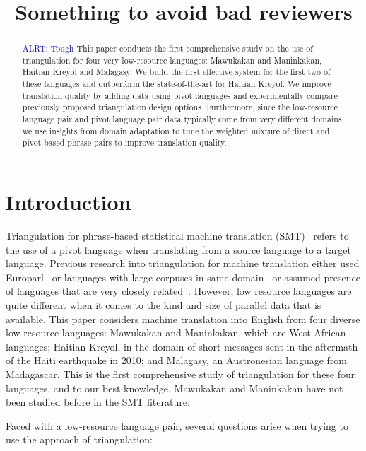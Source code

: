 \documentclass[11pt]{article}
\title{Something to avoid bad reviewers}
\author{}
\date{}
\newcommand{\alert}[1]{{\textcolor{blue}{ALRT: #1}}}
\begin{document}
\maketitle

\begin{abstract}
\alert{Tough}
This paper conducts the first comprehensive study on the use of triangulation for four very low-resource languages: Mawukakan and Maninkakan, Haitian Kreyol and Malagasy. We build the first effective system for the first two of these languages and outperform the state-of-the-art for Haitian Kreyol. We improve translation quality by adding data using pivot languages and experimentally compare previously proposed triangulation design options. Furthermore, since the low-resource language pair and pivot language pair data typically come from very different domains, we use insights from domain adaptation to tune the weighted mixture of direct and pivot based phrase pairs to improve translation quality.
\end{abstract}

\section{Introduction}

Triangulation for phrase-based statistical machine translation (SMT)~\cite{Utiyama:07,Cohn:07,Wuwang:07} refers to the use of a pivot language when translating from a source language to a target language. Previous research into triangulation for machine translation either used Europarl~\cite{Cohn:07,Utiyama:07,Huck:12} or languages with large corpuses in same domain~\cite{Gispert:06} or assumed presence of languages that are very closely related~\cite{Nakov:12,Nakovemnlp:12}. However, low resource languages are quite different when it comes to the kind and size of parallel data that is available. This paper considers machine translation into English from four diverse low-resource languages: Mawukakan and Maninkakan, which are West African languages;  Haitian Kreyol, in the domain of short messages sent in the aftermath of the Haiti earthquake in 2010; and Malagasy, an Austronesian language from Madagascar. This is the first comprehensive study of triangulation for these four languages, and to our best knowledge, Mawukakan and Maninkakan have not been studied before in the SMT literature.

Faced with a low-resource language pair, several questions arise when trying to use the approach of triangulation:
\end{document}
